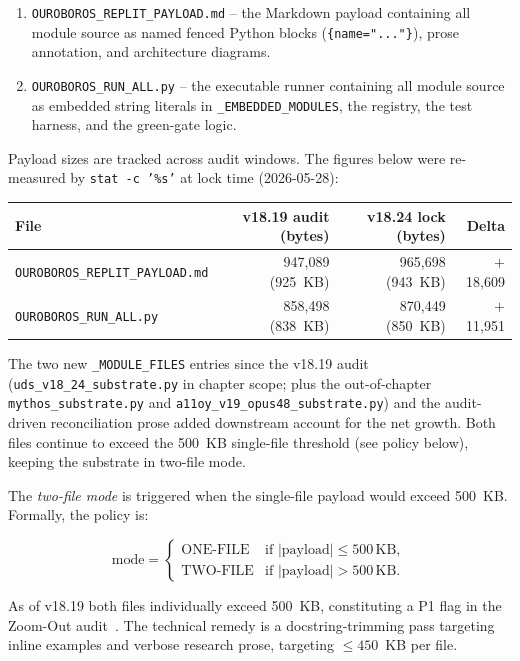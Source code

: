 \begin{enumerate}
  \item \texttt{OUROBOROS\_REPLIT\_PAYLOAD.md} -- the Markdown payload containing
    all module source as named fenced Python blocks (\texttt{\{name="..."\}}),
    prose annotation, and architecture diagrams.
  \item \texttt{OUROBOROS\_RUN\_ALL.py} -- the executable runner containing all
    module source as embedded string literals in \texttt{\_EMBEDDED\_MODULES},
    the registry, the test harness, and the green-gate logic.
\end{enumerate}

Payload sizes are tracked across audit windows.  The figures below were
re-measured by \texttt{stat -c '\%s'} at lock time (2026-05-28):

\begin{center}
\begin{tabular}{lrrr}
\textbf{File} & \textbf{v18.19 audit (bytes)} & \textbf{v18.24 lock (bytes)} & \textbf{Delta} \\
\hline
\texttt{OUROBOROS\_REPLIT\_PAYLOAD.md} & 947,089 (925~KB) & 965,698 (943~KB) & $+$18,609 \\
\texttt{OUROBOROS\_RUN\_ALL.py} & 858,498 (838~KB) & 870,449 (850~KB) & $+$11,951 \\
\end{tabular}
\end{center}

The two new \texttt{\_MODULE\_FILES} entries since the v18.19 audit
(\texttt{uds\_v18\_24\_substrate.py} in chapter scope; plus the
out-of-chapter \texttt{mythos\_substrate.py} and
\texttt{a11oy\_v19\_opus48\_substrate.py}) and the audit-driven
reconciliation prose added downstream account for the net growth.  Both
files continue to exceed the 500~KB single-file threshold (see policy
below), keeping the substrate in two-file mode.

The \emph{two-file mode} is triggered when the single-file payload would
exceed 500~KB.  Formally, the policy is:

\[
  \text{mode} = \begin{cases}
    \text{ONE-FILE} & \text{if } |\text{payload}| \leq 500\,\text{KB}, \\
    \text{TWO-FILE} & \text{if } |\text{payload}| > 500\,\text{KB}.
  \end{cases}
\]

As of v18.19 both files individually exceed 500~KB, constituting a P1 flag
in the Zoom-Out audit~\cite{szl_zoom_out_v18}.  The technical remedy is
a docstring-trimming pass targeting inline examples and verbose research prose,
targeting \(\leq 450\)~KB per file.

